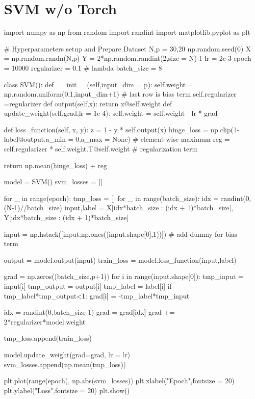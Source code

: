 \documentclass[10pt]{article}
\begin{document}
\section{SVM w/o Torch}
\begin{python}
import numpy as np
from random import randint
import matplotlib.pyplot as plt

# Hyperparameters setup and Prepare Dataset
N,p = 30,20
np.random.seed(0)
X = np.random.randn(N,p)
Y = 2*np.random.randint(2,size = N)-1
lr = 2e-3
epoch = 10000
regularizer = 0.1 # lambda
batch_size = 8

class SVM():
    def __init__(self,input_dim = p):
        self.weight = np.random.uniform(0,1,input_dim+1) # last row is bias term
        self.regularizer =regularizer
    def output(self,x):
        return x@self.weight
    def update_weight(self,grad,lr = 1e-4):
        self.weight = self.weight - lr * grad

    def loss_function(self, x, y):
        z = 1 - y * self.output(x)
        hinge_loss = np.clip(1-label@output,a_min = 0,a_max = None)  # element-wise maximum
        reg = self.regularizer * self.weight.T@self.weight  # regularization term

        return np.mean(hinge_loss) + reg

model = SVM()
svm_losses = []

for _ in range(epoch):
    tmp_loss = []
    for _ in range(batch_size):
        idx = randint(0,(N-1)//batch_size)
        input,label = X[idx*batch_size : (idx + 1)*batch_size], Y[idx*batch_size : (idx + 1)*batch_size]

        input = np.hstack([input,np.ones((input.shape[0],1))]) # add dummy for bias term

        output = model.output(input)
        train_loss = model.loss_function(input,label)

        grad = np.zeros((batch_size,p+1))
        for i in range(input.shape[0]):
            tmp_input = input[i]
            tmp_output = output[i]
            tmp_label = label[i]
            if tmp_label*tmp_output<1:
                grad[i] = -tmp_label*tmp_input

        idx = randint(0,batch_size-1)
        grad = grad[idx]
        grad += 2*regularizer*model.weight

        tmp_loss.append(train_loss)
        
        model.update_weight(grad=grad, lr = lr)
    svm_losses.append(np.mean(tmp_loss))

plt.plot(range(epoch), np.abs(svm_losses))
plt.xlabel("Epoch",fontsize = 20)
plt.ylabel("Loss",fontsize = 20)
plt.show()
\end{python}
\end{document}
